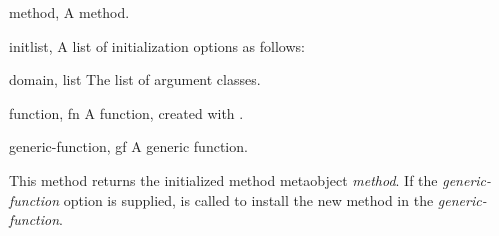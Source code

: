 %
\begin{optDefinition}
%
%
\begin{specargs}
    \item[method, \classref{method}] A method.

    \item[initlist, \classref{list}] A list of initialization options as
    follows:
    \begin{options}
        \item[domain, list] The list of argument classes.
        \item[function, fn] A function, created with
        .
        \item[generic-function, gf] A generic function.
    \end{options}
\end{specargs}
%
\result%
This method returns the initialized method metaobject {\em method}.  If the {\em
    generic-function\/} option is supplied,  is called to
install the new method in the {\em generic-function}.
%
\end{optDefinition}

